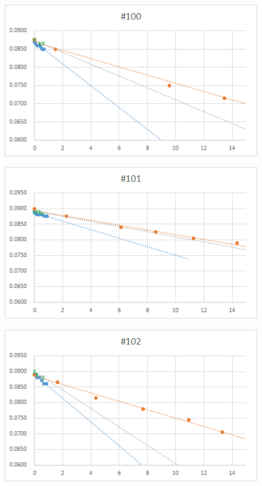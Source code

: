  \begin{figure}[htbp]
    \centering
       \includegraphics[width=120mm]{vol_100.png}
  \end{figure}
  \begin{figure}[htbp]
    \centering
       \includegraphics[width=120mm]{vol_101.png}
  \end{figure}
  \begin{figure}[htbp]
    \centering
       \includegraphics[width=120mm]{vol_102.png}
  \end{figure}
